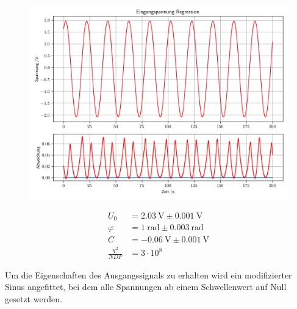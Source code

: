 \documentclass[12pt,twoside,a4paper]{scrartcl}
\begin{document}
			\begin{figure}[H]
				\begin{minipage}{0.69 \textwidth}
					\includegraphics[width =  \textwidth]{Plots/rectifier/eingang}
				\end{minipage}
				\begin{minipage}{0.29 \textwidth}
					\begin{align*}
						U_0 &= \SI{2.03}{\volt} \pm \SI{0.001}{ \volt} \\
						\varphi &= \SI{1}{\radian} \pm \SI{0.003}{\radian} \\
						C &= \SI{-0.06}{ \volt } \pm \SI{0.001}{\volt} \\
						\frac{\chi^2}{NDF} &= 3 \cdot 10^8
					\end{align*}
				\end{minipage}
			\end{figure}

			Um die Eigenschaften des Ausgangssignals zu erhalten wird ein modifizierter Sinus angefittet, bei dem alle Spannungen ab einem Schwellenwert auf Null gesetzt werden.
\end{document}
